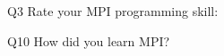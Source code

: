 \begin{description}%
\item{Q3} Rate your MPI programming skill:%
\item{Q10} How did you learn MPI?%
\end{description}%

